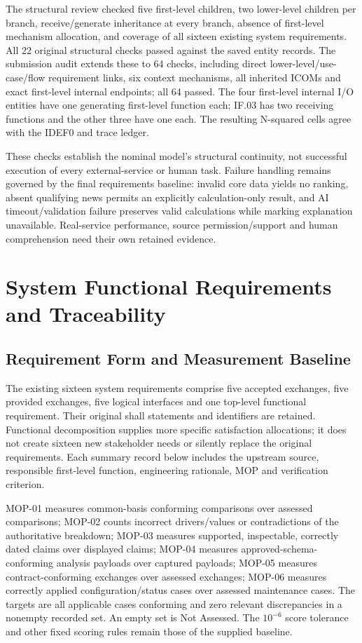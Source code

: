\documentclass[11pt,letterpaper]{article}
\begin{document}
The structural review checked five first-level children, two lower-level children per branch, receive/generate inheritance at every branch, absence of first-level mechanism allocation, and coverage of all sixteen existing system requirements. All 22 original structural checks passed against the saved entity records. The submission audit extends these to 64 checks, including direct lower-level/use-case/flow requirement links, six context mechanisms, all inherited ICOMs and exact first-level internal endpoints; all 64 passed. The four first-level internal I/O entities have one generating first-level function each; IF.03 has two receiving functions and the other three have one each. The resulting N-squared cells agree with the IDEF0 and trace ledger.

These checks establish the nominal model's structural continuity, not successful execution of every external-service or human task. Failure handling remains governed by the final requirements baseline: invalid core data yields no ranking, absent qualifying news permits an explicitly calculation-only result, and AI timeout/validation failure preserves valid calculations while marking explanation unavailable. Real-service performance, source permission/support and human comprehension need their own retained evidence.

\section{System Functional Requirements and Traceability}
\subsection{Requirement Form and Measurement Baseline}
The existing sixteen system requirements comprise five accepted exchanges, five provided exchanges, five logical interfaces and one top-level functional requirement. Their original shall statements and identifiers are retained. Functional decomposition supplies more specific satisfaction allocations; it does not create sixteen new stakeholder needs or silently replace the original requirements. Each summary record below includes the upstream source, responsible first-level function, engineering rationale, MOP and verification criterion.

MOP-01 measures common-basis conforming comparisons over assessed comparisons; MOP-02 counts incorrect drivers/values or contradictions of the authoritative breakdown; MOP-03 measures supported, inspectable, correctly dated claims over displayed claims; MOP-04 measures approved-schema-conforming analysis payloads over captured payloads; MOP-05 measures contract-conforming exchanges over assessed exchanges; MOP-06 measures correctly applied configuration/status cases over assessed maintenance cases. The targets are all applicable cases conforming and zero relevant discrepancies in a nonempty recorded set. An empty set is Not Assessed. The $10^{-6}$ score tolerance and other fixed scoring rules remain those of the supplied baseline\cite{baseline}.
\end{document}
